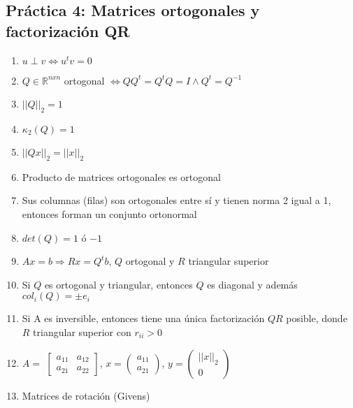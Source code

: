 \subsection*{Práctica 4: Matrices ortogonales y factorización QR}
\begin{enumerate}
    \item $u \perp v \iff u^tv=0$
    \item $Q \in \mathbb{R}^{nxn}$ ortogonal $\iff QQ^t=Q^tQ=I \land Q^t=Q^{-1}$
    \item $||Q||_2 = 1$
    \item $\kappa_2(Q) = 1$
    \item $||Qx||_2=||x||_2$
    \item Producto de matrices ortogonales es ortogonal
    \item Sus columnas (filas) son ortogonales entre sí y tienen norma 2 igual a 1, entonces forman un conjunto ortonormal
    \item $det(Q)= 1$ ó $-1$
    \item $Ax=b \Rightarrow Rx=Q^tb$,  $Q$ ortogonal y $R$ triangular superior
    \item Si $Q$ es ortogonal y triangular, entonces $Q$ es diagonal y además $col_i(Q)=\pm e_i$
    \item Si A es inversible, entonces tiene una única factorización $QR$ posible, donde $R$ triangular superior con $r_{ii} > 0$
    \item $A =$ $ \begin{bmatrix}
a_{11} & a_{12} \\
a_{21} & a_{22} 
\end{bmatrix}  $, $x = \begin{pmatrix}
a_{11} \\
a_{21} 
\end{pmatrix}$, $y =  \begin{pmatrix}
||x||_2 \\
0 
\end{pmatrix}  $
    \item Matrices de rotación (Givens)
\end{enumerate}
